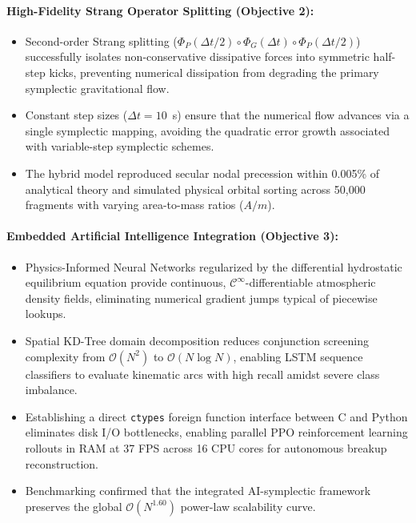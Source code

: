 \documentclass[12pt,letterpaper,twoside]{book}
\begin{document}
\paragraph{High-Fidelity Strang Operator Splitting (Objective 2):}
\begin{itemize}
    \item Second-order Strang splitting ($\Phi_P(\Delta t/2) \circ \Phi_G(\Delta t) \circ \Phi_P(\Delta t/2)$) successfully isolates non-conservative dissipative forces into symmetric half-step kicks, preventing numerical dissipation from degrading the primary symplectic gravitational flow.
    \item Constant step sizes ($\Delta t = 10$~s) ensure that the numerical flow advances via a single symplectic mapping, avoiding the quadratic error growth associated with variable-step symplectic schemes.
    \item The hybrid model reproduced secular nodal precession within 0.005\% of analytical theory and simulated physical orbital sorting across 50,000 fragments with varying area-to-mass ratios ($A/m$).
\end{itemize}

\paragraph{Embedded Artificial Intelligence Integration (Objective 3):}
\begin{itemize}
    \item Physics-Informed Neural Networks regularized by the differential hydrostatic equilibrium equation provide continuous, $\mathcal{C}^\infty$-differentiable atmospheric density fields, eliminating numerical gradient jumps typical of piecewise lookups.
    \item Spatial KD-Tree domain decomposition reduces conjunction screening complexity from $\mathcal{O}(N^2)$ to $\mathcal{O}(N \log N)$, enabling LSTM sequence classifiers to evaluate kinematic arcs with high recall amidst severe class imbalance.
    \item Establishing a direct \texttt{ctypes} foreign function interface between C and Python eliminates disk I/O bottlenecks, enabling parallel PPO reinforcement learning rollouts in RAM at 37 FPS across 16 CPU cores for autonomous breakup reconstruction.
    \item Benchmarking confirmed that the integrated AI-symplectic framework preserves the global $\mathcal{O}(N^{1.60})$ power-law scalability curve.
\end{itemize}
\end{document}
